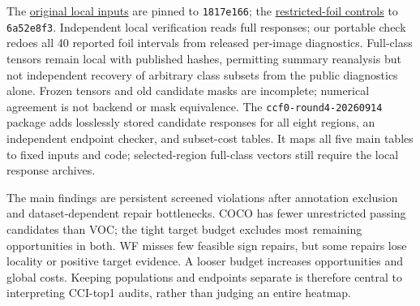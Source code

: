 \documentclass[10pt]{article}
\begin{document}
The \href{https://github.com/jovial-liu/conway/tree/1817e1666161fa902869affe61b55f7c98c45668/experiments}{original local inputs}
are pinned to \texttt{1817e166}; the
\href{https://github.com/jovial-liu/conway/tree/6a52e8f3d39f343d8483390882dcb5e57003d904/experiments/reviewer_controls_2026-09-13}{restricted-foil controls}
to \texttt{6a52e8f3}. Independent local verification reads full responses;
our portable check redoes all 40 reported foil intervals from released per-image
diagnostics. Full-class tensors remain local with published hashes, permitting
summary reanalysis but not independent recovery of arbitrary class subsets from
the public diagnostics alone. Frozen tensors and old candidate masks are
incomplete; numerical agreement is not backend or mask equivalence.
The \texttt{ccf0-round4-20260914} package adds losslessly stored candidate
responses for all eight regions, an independent endpoint checker, and
subset-cost tables. It maps all five main tables to fixed inputs and code;
selected-region full-class vectors still require the local response archives.

The main findings are persistent screened violations after annotation exclusion
and dataset-dependent repair bottlenecks. COCO has fewer unrestricted passing
candidates than VOC; the tight target budget excludes most remaining
opportunities in both. WF misses few feasible sign repairs, but some repairs
lose locality or positive target evidence. A looser budget increases opportunities
and global costs. Keeping populations and endpoints separate is therefore
central to interpreting CCI-top1 audits, rather than judging an entire heatmap.

\clearpage
\balance

\end{document}
